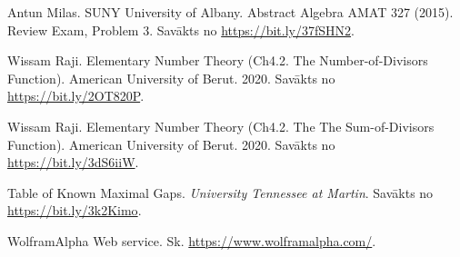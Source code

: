 \documentclass[a4paper,12pt]{article}
\begin{document}
\begin{thebibliography}{1}

 Antun Milas. SUNY University of Albany. Abstract Algebra AMAT 327 (2015).
Review Exam, Problem 3. Savākts no \url{https://bit.ly/37fSHN2}.

 Wissam Raji. Elementary Number Theory (Ch4.2. The Number-of-Divisors Function). American University of Berut. 2020. 
Savākts no \url{https://bit.ly/2OT820P}. 

 Wissam Raji. Elementary Number Theory (Ch4.2. The The Sum-of-Divisors Function). American University of Berut. 2020. 
Savākts no \url{https://bit.ly/3dS6iiW}.

 Table of Known Maximal Gaps. {\em University Tennessee at Martin}. Savākts no \url{https://bit.ly/3k2Kimo}.

 WolframAlpha Web service. Sk. \url{https://www.wolframalpha.com/}.
\end{thebibliography}
\end{document}
